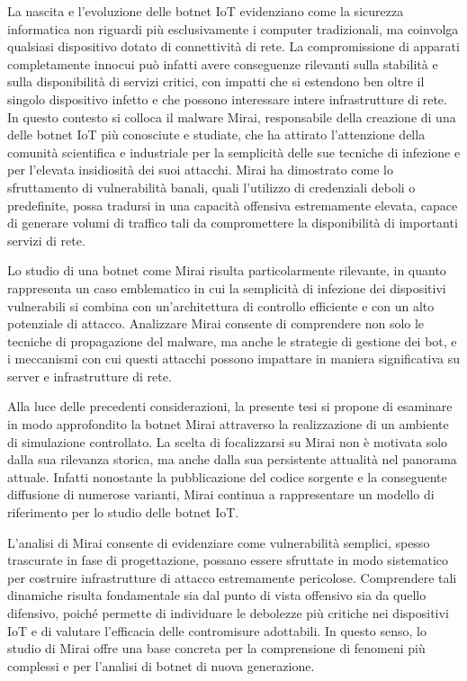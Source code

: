 La nascita e l'evoluzione delle botnet IoT evidenziano come la sicurezza informatica non riguardi più esclusivamente i computer tradizionali, ma coinvolga qualsiasi dispositivo dotato di connettività di rete. La compromissione di apparati completamente innocui può infatti avere conseguenze rilevanti sulla stabilità e sulla disponibilità di servizi critici, con impatti che si estendono ben oltre il singolo dispositivo infetto e che possono interessare intere infrastrutture di rete. In questo contesto si colloca il malware Mirai, responsabile della creazione di una delle botnet IoT più conosciute e studiate, che ha attirato l'attenzione della comunità scientifica e industriale per la semplicità delle sue tecniche di infezione e per l'elevata insidiosità dei suoi attacchi. Mirai ha dimostrato come lo sfruttamento di vulnerabilità banali, quali l'utilizzo di credenziali deboli o predefinite, possa tradursi in una capacità offensiva estremamente elevata, capace di generare volumi di traffico tali da compromettere la disponibilità di importanti servizi di rete. 

Lo studio di una botnet come Mirai risulta particolarmente rilevante, in quanto rappresenta un caso emblematico in cui la semplicità di infezione dei dispositivi vulnerabili si combina con un'architettura di controllo efficiente e con un alto potenziale di attacco. Analizzare Mirai consente di comprendere non solo le tecniche di propagazione del malware, ma anche le strategie di gestione dei bot, e i meccanismi con cui questi attacchi possono impattare in maniera significativa su server e infrastrutture di rete.


Alla luce delle precedenti considerazioni, la presente tesi si propone di esaminare in modo approfondito la botnet Mirai attraverso la realizzazione di un ambiente di simulazione controllato. La scelta di focalizzarsi su Mirai non è motivata solo dalla sua rilevanza storica, ma anche dalla sua persistente attualità nel panorama attuale. Infatti nonostante la pubblicazione del codice sorgente e la conseguente diffusione di numerose varianti, Mirai continua a rappresentare un modello di riferimento per lo studio delle botnet IoT. 

L'analisi di Mirai consente di evidenziare come vulnerabilità semplici, spesso trascurate in fase di progettazione, possano essere sfruttate in modo sistematico per costruire infrastrutture di attacco estremamente pericolose. Comprendere tali dinamiche risulta fondamentale sia dal punto di vista offensivo sia da quello difensivo, poiché permette di individuare le debolezze più critiche nei dispositivi IoT e di valutare l'efficacia delle contromisure adottabili. In questo senso, lo studio di Mirai offre una base concreta per la comprensione di fenomeni più complessi e per l'analisi di botnet di nuova generazione. 

